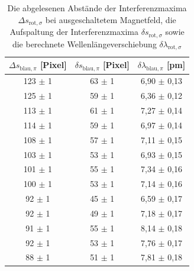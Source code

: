               \begin{table}[h]
                \centering
                \caption{Die abgelesenen Abstände der Interferenzmaxima $\Delta s_{\text{rot}, \sigma}$ bei ausgeschaltetem Magnetfeld, die Aufspaltung der Interferenzmaxima $\delta s_{\text{rot}, \sigma}$ sowie die berechnete Wellenlängeverschiebung $\delta \lambda_{\text{rot}, \sigma}$}
                \label{tab:blau_pi}
              
                \begin{tabular}{c c c}
                  \toprule
                  {$\Delta s_{\text{blau}, \pi}$ [Pixel]} & {$\delta s_{\text{blau}, \pi}$ [Pixel]} & {$\delta \lambda_{\text{blau}, \pi}$ [\si{\pico\metre}]} \\ 
                  \midrule
                   123 $\pm$ 1  &   63 $\pm$ 1   &   6,90 $\pm$ 0,13   \\
                   125 $\pm$ 1  &   59 $\pm$ 1   &   6,36 $\pm$ 0,12   \\
                   113 $\pm$ 1  &   61 $\pm$ 1   &   7,27 $\pm$ 0,14   \\
                   114 $\pm$ 1  &   59 $\pm$ 1   &   6,97 $\pm$ 0,14   \\
                   108 $\pm$ 1  &   57 $\pm$ 1   &   7,11 $\pm$ 0,15   \\
                   103 $\pm$ 1  &   53 $\pm$ 1   &   6,93 $\pm$ 0,15   \\
                   101 $\pm$ 1  &   55 $\pm$ 1   &   7,34 $\pm$ 0,16   \\
                   100 $\pm$ 1  &   53 $\pm$ 1   &   7,14 $\pm$ 0,16   \\
                   92  $\pm$ 1  &   45 $\pm$ 1   &   6,59 $\pm$ 0,17   \\
                   92  $\pm$ 1  &   49 $\pm$ 1   &   7,18 $\pm$ 0,17   \\
                   91  $\pm$ 1  &   55 $\pm$ 1   &   8,14 $\pm$ 0,18   \\
                   92  $\pm$ 1  &   53 $\pm$ 1   &   7,76 $\pm$ 0,17   \\
                   88  $\pm$ 1  &   51 $\pm$ 1   &   7,81 $\pm$ 0,18   \\

                  \bottomrule
                \end{tabular}
              \end{table}
              \FloatBarrier






